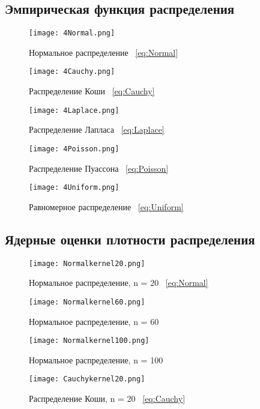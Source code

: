 \documentclass[12pt,a4paper]{scrartcl}
\begin{document}
\subsection{Эмпирическая функция распределения}
\begin{figure}[H]
  \centering
  \texttt{[image: 4Normal.png]}
  \caption{Нормальное распределение ~\eqref{eq:Normal}}
 
\end{figure}
\begin{figure}[H]
  \centering
  \texttt{[image: 4Cauchy.png]}
  \caption{Распределение Коши ~\eqref{eq:Cauchy}}
\end{figure}
\begin{figure}[H]
\centering
  \texttt{[image: 4Laplace.png]}
  \caption{Распределение Лапласа ~\eqref{eq:Laplace}}
\end{figure}
\begin{figure}[H]
  \centering
  \texttt{[image: 4Poisson.png]}
  \caption{Распределение Пуассона ~\eqref{eq:Poisson}}
\end{figure}
\begin{figure}[H]
  \centering
  \texttt{[image: 4Uniform.png]}
  \caption{Равномерное распределение ~\eqref{eq:Uniform}}
\end{figure}

\subsection{Ядерные оценки плотности распределения}
\begin{figure}[H]
  \centering
  \texttt{[image: Normalkernel20.png]}
  \caption{Нормальное распределение, n = 20 ~\eqref{eq:Normal}}
\end{figure}

\begin{figure}[H]
  \centering
  \texttt{[image: Normalkernel60.png]}
  \caption{Нормальное распределение, n = 60}
\end{figure}

\begin{figure}[H]
  \centering
  \texttt{[image: Normalkernel100.png]}
  \caption{Нормальное распределение, n = 100}
\end{figure}

\begin{figure}[H]
  \centering
  \texttt{[image: Cauchykernel20.png]}
  \caption{Распределение Коши, n = 20 ~\eqref{eq:Cauchy}}
\end{figure}
\end{document}
